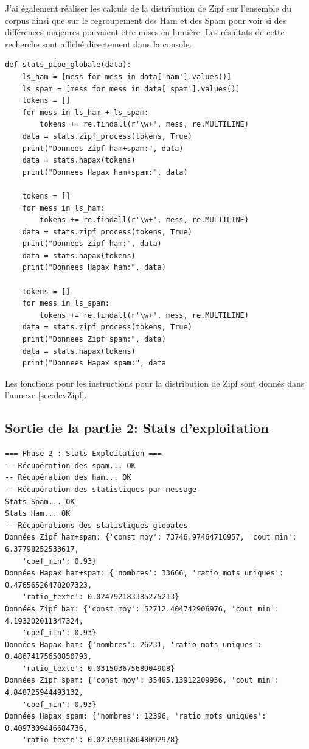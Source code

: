 \documentclass[a4paper,12pt]{article}
\begin{document}
	J'ai également réaliser les calculs de la distribution de Zipf sur l'ensemble du corpus ainsi que sur le regroupement des Ham et des Spam pour voir si des différences majeures pouvaient être mises en lumière. Les résultats de cette recherche sont affiché directement dans la console.
		
		\begin{lstlisting}[title=Pipeline pour les données globales]
def stats_pipe_globale(data):
    ls_ham = [mess for mess in data['ham'].values()]
    ls_spam = [mess for mess in data['spam'].values()]
    tokens = []
    for mess in ls_ham + ls_spam:
        tokens += re.findall(r'\w+', mess, re.MULTILINE)
    data = stats.zipf_process(tokens, True)
    print("Donnees Zipf ham+spam:", data)
    data = stats.hapax(tokens)
    print("Donnees Hapax ham+spam:", data)

    tokens = []
    for mess in ls_ham:
        tokens += re.findall(r'\w+', mess, re.MULTILINE)
    data = stats.zipf_process(tokens, True)
    print("Donnees Zipf ham:", data)
    data = stats.hapax(tokens)
    print("Donnees Hapax ham:", data)

    tokens = []
    for mess in ls_spam:
        tokens += re.findall(r'\w+', mess, re.MULTILINE)
    data = stats.zipf_process(tokens, True)
    print("Donnees Zipf spam:", data)
    data = stats.hapax(tokens)
    print("Donnees Hapax spam:", data
		\end{lstlisting}
	
	Les fonctions pour les instructions pour la distribution de Zipf sont donnés dans l'annexe \ref{sec:devZipf}.
		
	\subsection{Sortie de la partie 2: Stats d'exploitation}
		\begin{verbatim}
=== Phase 2 : Stats Exploitation ===
-- Récupération des spam... OK
-- Récupération des ham... OK
-- Récupération des statistiques par message
Stats Spam... OK
Stats Ham... OK
-- Récupérations des statistiques globales
Données Zipf ham+spam: {'const_moy': 73746.97464716957, 'cout_min': 6.37798252533617, 
	'coef_min': 0.93}
Données Hapax ham+spam: {'nombres': 33666, 'ratio_mots_uniques': 0.47656526478207323, 
	'ratio_texte': 0.024792183385275213}
Données Zipf ham: {'const_moy': 52712.404742906976, 'cout_min': 4.193202011347324, 
	'coef_min': 0.93}
Données Hapax ham: {'nombres': 26231, 'ratio_mots_uniques': 0.48674175650850793, 
	'ratio_texte': 0.03150367568904908}
Données Zipf spam: {'const_moy': 35485.13912209956, 'cout_min': 4.848725944493132, 
	'coef_min': 0.93}
Données Hapax spam: {'nombres': 12396, 'ratio_mots_uniques': 0.4097309446684736, 
	'ratio_texte': 0.023598168648092978}
		\end{verbatim}
	
\end{document}
